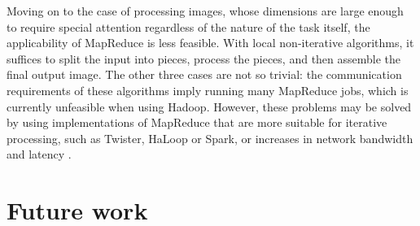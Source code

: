 \documentclass [12pt,a4paper]{report}
\begin{document}
Moving on to the case of processing images, whose dimensions are large enough to require special attention regardless of the nature of the task itself, the applicability of MapReduce is less feasible. With local non-iterative algorithms, it suffices to split the input into pieces, process the pieces, and then assemble the final output image. The other three cases are not so trivial: the communication requirements of these algorithms imply running many MapReduce jobs, which is currently unfeasible when using Hadoop. However, these problems may be solved by using implementations of MapReduce that are more suitable for iterative processing, such as Twister, HaLoop or Spark, or increases in network bandwidth and latency \cite{ekanayake2010twister,bu2010haloop,zaharia2010spark}. 

\chapter{Future work}

\clearpage
{}


\end{document}
